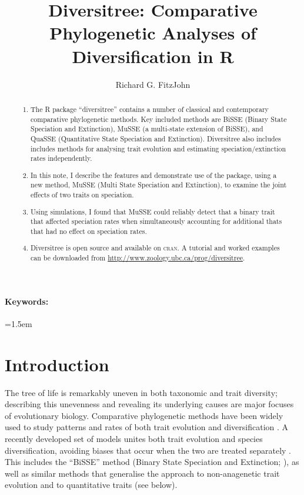 \documentclass[12pt]{article}
\title{Diversitree: Comparative Phylogenetic Analyses of
  Diversification in R}
\author{Richard G. FitzJohn}
\date{}
\affiliation{\noindent
\textit{Department of Zoology \& Biodiversity Research Centre,\\University
  of British Columbia, Vancouver, BC, V6T 1Z4, Canada.}\\
Email: \email{fitzjohn@zoology.ubc.ca}\\
Word count: 4663 (including 300 in appendix)}
\begin{document}
\mstitlepage


\begin{abstract}
  \begin{enumerate}
  \item The R package ``diversitree'' contains a number of classical
    and contemporary comparative phylogenetic methods.  Key included
    methods are BiSSE (Binary State Speciation and Extinction), MuSSE
    (a multi-state extension of BiSSE), and QuaSSE (Quantitative State
    Speciation and Extinction).
    Diversitree also includes includes methods for analysing trait
    evolution and estimating speciation/extinction rates
    independently.
  \item In this note, I describe the features and demonstrate use of
    the package, using a new method, MuSSE (Multi State Speciation and
    Extinction), to examine the joint effects of two traits on
    speciation.
  \item Using simulations, I found that MuSSE could reliably detect
    that a binary trait that affected speciation rates when
    simultaneously accounting for additional thats that had no effect
    on speciation rates.
  \item Diversitree is open source and available on \textsc{cran}.  A
    tutorial and worked examples can be downloaded from
    \url{http://www.zoology.ubc.ca/prog/diversitree}.
  \end{enumerate}
\end{abstract}

\vfill
\paragraph{Keywords:} \thekeywords

\clearpage
\parindent=1.5em
\addtolength{\parskip}{.3em}

\section{Introduction}

The tree of life is remarkably uneven in both taxonomic and trait
diversity; describing this unevenness and revealing its underlying
causes are major focuses of evolutionary biology.
%
Comparative phylogenetic methods have been widely used to study
patterns and rates of both trait evolution
\citep{Felsenstein-1985-1,Pagel-1994-37} and diversification
\citep{Nee-1994-305}.
%
A recently developed set of models unites both trait evolution and
species diversification, avoiding biases that occur when the two are
treated separately \citep{Maddison-2006-1743}.  This includes the
``BiSSE'' method (Binary State Speciation and Extinction;
\citealp{Maddison-2007-701}), as well as similar methods that
generalise the approach to non-anagenetic trait evolution and to
quantitative traits (see below).
\end{document}
